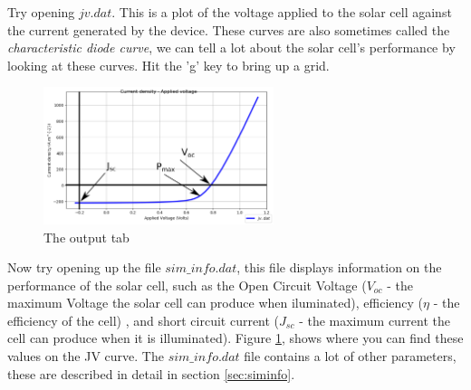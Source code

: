 Try opening $jv.dat$. This is a plot of the voltage applied to the solar cell against the current generated by the device.  These curves are also sometimes called the \emph{characteristic diode curve}, we can tell a lot about the solar cell's performance by looking at these curves.  Hit the 'g' key to bring up a grid.

\begin{figure}[H]
\centering
\includegraphics[width=0.6\textwidth]{./images/running/jv_curve.png}
\caption{The output tab}
\label{fig:jv_curve}
\end{figure}


Now try opening up the file $sim\_info.dat$, this file displays information on the performance of the solar cell, such as the Open Circuit Voltage ($V_{oc}$ - the maximum Voltage the solar cell can produce when iluminated), efficiency ($\eta$ - the efficiency of the cell) , and short circuit current ($J_{sc}$ - the maximum current the cell can produce when it is illuminated).  Figure \ref{fig:jv_curve}, shows where you can find these values on the JV curve.  The $sim\_info.dat$ file contains a lot of other parameters, these are described in detail in section \ref{sec:siminfo}.

\vspace*{\fill}


